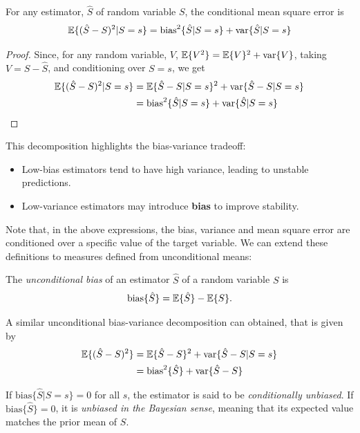 \begin{theorem}
For any estimator, $\hat{S}$ of random variable $S$, the conditional mean square error is
\begin{align}
\mathbb{E}\{(\hat{S}-S)^2|S=s\} = {\rm bias}^2\{\hat{S} | S=s\} + {\rm var}\{\hat{S} | S=s\}
\end{align}
\end{theorem}


\begin{proof}

Since, for any random variable, $V$, $\mathbb{E}\{V^2\} = \mathbb{E}\{V\}^2 + {\rm var}\{V\}$, taking $V=S-\hat{S}$, and conditioning over $S=s$, we get
\begin{align}
\mathbb{E}\{(\hat{S}-S)^2|S=s\} 
	&= \mathbb{E}\{\hat{S}-S|S=s\}^2 + {\rm var}\{\hat{S}-S|S=s\}   \nonumber\\
	&= {\rm bias}^2\{\hat{S} | S=s\} + {\rm var}\{\hat{S}|S=s\} 
\end{align}
\end{proof}

This decomposition highlights the bias-variance tradeoff:
\begin{itemize}
\item Low-bias estimators tend to have high variance, leading to unstable predictions.
\item Low-variance estimators may introduce \textbf{bias} to improve stability.
\end{itemize}


Note that, in the above expressions, the bias, variance and mean square error are conditioned over a specific value of the target variable. We can extend these definitions to measures defined from unconditional means:

\begin{definition}
The \textit{unconditional bias} of an estimator $\hat{S}$ of a random variable $S$ is
\begin{align}
\text{bias}\{\hat{S}\} = \mathbb{E}\{\hat{S}\} - \mathbb{E}\{S\}.
\end{align}
\end{definition}

A similar unconditional bias-variance decomposition can obtained, that is given by
\begin{align}
\mathbb{E}\{(\hat{S}-S)^2\} 
	&= \mathbb{E}\{\hat{S}-S\}^2 + {\rm var}\{\hat{S}-S|S=s\}   \nonumber\\
	&= {\rm bias}^2\{\hat{S}\} + {\rm var}\{\hat{S}-S\} 
\end{align}

If $\text{bias}\{\hat{S} | S = s\} = 0$ for all $s$, the estimator is said to be \textit{conditionally unbiased}. If $\text{bias}\{\hat{S}\} = 0$, it is \textit{unbiased in the Bayesian sense}, meaning that its expected value matches the prior mean of $S$.


